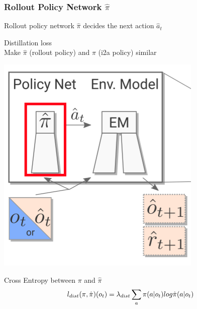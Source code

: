     

\begin{frame}
    \frametitle{Rollout Policy Network $\hat{\pi}$}

\begin{multicols}{2}
	\begin{PraesentationAufzaehlung}
	    \item Rollout policy network $\hat{\pi}$ decides the next action $\hat{a}_t$
		\item Distillation loss\\
		Make $\hat{\pi}$ (rollout policy) and $\pi$ (i2a policy) similar\\
	\end{PraesentationAufzaehlung}
    \vfill\columnbreak
	\begin{center}
    \includegraphics[height=0.35\textheight]{./Images/policy_net.png}%
	\end{center}
\end{multicols}
\vspace{-22mm}
\hspace{4mm}
Cross Entropy between $\pi$ and $\hat{\pi}$\\
	\begin{equation}
		\mathnormal{
		l_{dist}(\pi, \hat{\pi})(o_t) = \lambda_{dist} \sum_a \pi(a | o_t) log \hat{\pi}(a|o_t)
		}
	\end{equation}
    
\end{frame}
\clearpage


